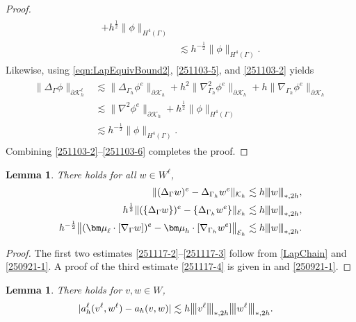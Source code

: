 \documentclass[10pt, a4paper]{amsart}
\newcommand{\p}{\partial}
\newcommand{\nab}{\nabla}
\newcommand{\bmu}{{\bm \mu}}
\newcommand{\calE}{\mathcal{E}}
\newcommand{\calK}{\mathcal{K}}
\newtheorem{lemma}[theorem]{Lemma}
\theoremstyle{definition}
\theoremstyle{remark}
\theoremstyle{example}
\numberwithin{equation}{section}
\newcommand{\tbar}[1]{{\left\vert\kern-0.25ex\left\vert\kern-0.25ex\left\vert #1 
    \right\vert\kern-0.25ex\right\vert\kern-0.25ex\right\vert}}
\begin{document}
\begin{proof}
\begin{align}
\begin{split}
 + h^{\frac{1}{2}}\|\phi\|_{H^4(\Gamma)} \\
& \lesssim h^{-\frac{1}{2}}\|\phi\|_{H^4(\Gamma)}.
\end{split}
\end{align}
Likewise, using \eqref{eqn:LapEquivBound2}, \eqref{251103-5}, and \eqref{251103-2} yields
\begin{align}
\begin{split} \label{251103-6}
\|\Delta_{\Gamma}\phi\|_{\p \calK^\ell_h}
& \lesssim \|\Delta_{\Gamma_h}\phi^e\|_{\p \calK_h} + h^2\|\nab_{\Gamma_h}^2\phi^e\|_{\partial\calK_h} + h\|\nab_{\Gamma_h}\phi^e\|_{\partial\calK_h} \\
& \lesssim \|\nab^2\phi^e\|_{\partial\calK_h} + h^{\frac{1}{2}}\|\phi\|_{H^4(\Gamma)} \\
& \lesssim h^{-\frac{1}{2}}\|\phi\|_{H^4(\Gamma)}.
\end{split}
\end{align}
Combining \eqref{251103-2}--\eqref{251103-6} completes the proof.
\end{proof}



\begin{lemma} \label{251117-1}
There holds for all $w \in W^\ell$,
\begin{align}
\|(\Delta_\Gamma w)^e - \Delta_{\Gamma_h}w^e\|_{\calK_h}
& \lesssim h\tbar{w}_{*, 2h}, \label{251117-2} \\
h^{\frac{1}{2}}\|(\{\Delta_{\Gamma}w\})^e - \{\Delta_{\Gamma_h}w^e\}\|_{\calE_h}
& \lesssim h\tbar{w}_{*, 2h}, \label{251117-3} \\
h^{-\frac{1}{2}}\big\|(\bmu_{\ell} \cdot [\nab_\Gamma w])^e - \bmu_h \cdot [\nab_{\Gamma_h}w^e]\big\|_{\calE_h}
& \lesssim h\tbar{w}_{*, 2h}. \label{251117-4}
\end{align}
\end{lemma}

\begin{proof}
The first two estimates \eqref{251117-2}--\eqref{251117-3} follow from
\eqref{LapChain} and \eqref{250921-1}. A proof of the third estimate \eqref{251117-4} is given in \cite[(C.12)--(C.14)]{neilan2025c0} and \eqref{250921-1}.
\end{proof}


\begin{lemma}\label{lem:aDiff1}
There holds for $v, w \in W$,
\begin{align}
|a_h^\ell(v^\ell, w^\ell) - a_h(v, w)|
& \lesssim h \tbar{v^\ell}_{*, 2h}\tbar{w^\ell}_{*, 2h}. \label{251117-16}
\end{align}
\end{lemma}
\end{document}
